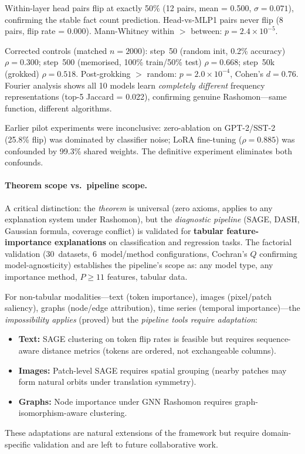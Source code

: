 \documentclass[11pt,a4paper]{article}
\begin{document}
Within-layer head pairs flip at exactly 50\% (12 pairs, mean = 0.500, $\sigma = 0.071$), confirming the stable fact count prediction. Head-vs-MLP1 pairs never flip (8 pairs, flip rate = 0.000). Mann-Whitney within $>$ between: $p = 2.4 \times 10^{-5}$.

Corrected controls (matched $n = 2000$): step~50 (random init, 0.2\% accuracy) $\rho = 0.300$; step~500 (memorised, 100\% train/50\% test) $\rho = 0.668$; step~50k (grokked) $\rho = 0.518$. Post-grokking $>$ random: $p = 2.0 \times 10^{-4}$, Cohen's $d = 0.76$. Fourier analysis shows all 10 models learn \emph{completely different} frequency representations (top-5 Jaccard = 0.022), confirming genuine Rashomon---same function, different algorithms.

Earlier pilot experiments were inconclusive: zero-ablation on GPT-2/SST-2 (25.8\% flip) was dominated by classifier noise; LoRA fine-tuning ($\rho = 0.885$) was confounded by 99.3\% shared weights. The definitive experiment eliminates both confounds.

\paragraph{Theorem scope vs.\ pipeline scope.}
A critical distinction: the \emph{theorem} is universal (zero axioms,
applies to any explanation system under Rashomon), but the
\emph{diagnostic pipeline} (SAGE, DASH, Gaussian formula, coverage
conflict) is validated for \textbf{tabular feature-importance
explanations} on classification and regression tasks.  The factorial
validation (30~datasets, 6~model/method configurations, Cochran's
$Q$ confirming model-agnosticity) establishes the pipeline's scope
as: any model type, any importance method, $P \geq 11$ features,
tabular data.

For non-tabular modalities---text (token importance), images
(pixel/patch saliency), graphs (node/edge attribution), time
series (temporal importance)---the \emph{impossibility applies}
(proved) but the \emph{pipeline tools require adaptation}:
\begin{itemize}
  \item \textbf{Text:} SAGE clustering on token flip rates is
    feasible but requires sequence-aware distance metrics (tokens
    are ordered, not exchangeable columns).
  \item \textbf{Images:} Patch-level SAGE requires spatial grouping
    (nearby patches may form natural orbits under translation symmetry).
  \item \textbf{Graphs:} Node importance under GNN Rashomon requires
    graph-isomorphism-aware clustering.
\end{itemize}
These adaptations are natural extensions of the framework but require
domain-specific validation and are left to future collaborative work.
\end{document}
